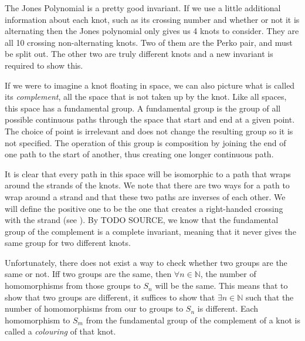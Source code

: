 \begin{paper}


The Jones Polynomial is a pretty good invariant.
If we use a little additional information about each knot, such as its crossing
number and whether or not it is alternating then the Jones polynomial only gives
us 4 knots to consider.
They are all 10 crossing non-alternating knots.
Two of them are the Perko pair, and must be split out.
The other two are truly different knots and a new invariant is required to show
this.

If we were to imagine a knot floating in space, we can also picture what is
called its \textit{complement}, all the space that is not taken up by the knot.
Like all spaces, this space has a fundamental group.
A fundamental group is the group of all possible continuous paths through the
space that start and end at a given point.
The choice of point is irrelevant and does not change the resulting group so it
is not specified.
The operation of this group is composition by joining the end of one path to the
start of another, thus creating one longer continuous path.

It is clear that every path in this space will be isomorphic to a path that
wraps around the strands of the knots.
We note that there are two ways for a path to wrap around a strand and that
these two paths are inverses of each other.
We will define the positive one to be the one that creates a right-handed
crossing with the strand (see \figCrossings).
By TODO SOURCE, we know that the fundamental group of the complement is a
complete invariant, meaning that it never gives the same group for two different
knots.

Unfortunately, there does not exist a way to check whether two groups are the
same or not.
Iff two groups are the same, then $\forall n\in\mathbb N$, the number of
homomorphisms from those groups to $S_n$ will be the same.
This means that to show that two groups are different, it suffices to show that
$\exists n\in\mathbb N$ such that the number of homomorphisms from our to groups
to $S_n$ is different.
Each homomorphism to $S_m$ from the fundamental group of the complement of a
knot is called a \textit{colouring} of that knot.

\\

\vspace{-4.5em}\hspace{15ex}{\fontsize{20pt}{1em}\selectfont$\equiv$}\\


\end{paper}
